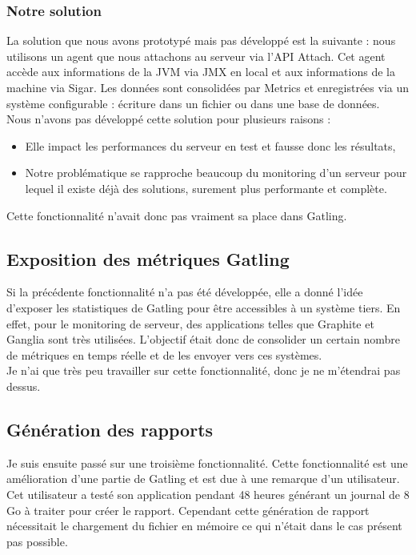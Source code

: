 \subsubsection{Notre solution}

La solution que nous avons prototypé mais pas développé est la suivante : nous utilisons un agent que nous attachons au serveur via l'API Attach. Cet agent accède aux informations de la JVM via JMX en local et aux informations de la machine via Sigar. Les données sont consolidées par Metrics et enregistrées via un système configurable : écriture dans un fichier ou dans une base de données.\\

Nous n'avons pas développé cette solution pour plusieurs raisons :
\begin{itemize}
 \item Elle impact les performances du serveur en test et fausse donc les résultats,
 \item Notre problématique se rapproche beaucoup du monitoring d'un serveur pour lequel il existe déjà des solutions, surement plus performante et complète.\\
\end{itemize}

Cette fonctionnalité n'avait donc pas vraiment sa place dans Gatling.

\subsection{Exposition des métriques Gatling}

Si la précédente fonctionnalité n'a pas été développée, elle a donné l'idée d'exposer les statistiques de Gatling pour être accessibles à un système tiers. En effet, pour le monitoring de serveur, des applications telles que Graphite et Ganglia sont très utilisées. L'objectif était donc de consolider un certain nombre de métriques en temps réelle et de les envoyer vers ces systèmes.\\

Je n'ai que très peu travailler sur cette fonctionnalité, donc je ne m'étendrai pas dessus.

\subsection{Génération des rapports}

Je suis ensuite passé sur une troisième fonctionnalité. Cette fonctionnalité est une amélioration d'une partie de Gatling et est due à une remarque d'un utilisateur. Cet utilisateur a testé son application pendant 48 heures générant un journal de 8 Go à traiter pour créer le rapport. Cependant cette génération de rapport nécessitait le chargement du fichier en mémoire ce qui n'était dans le cas présent pas possible.\\

